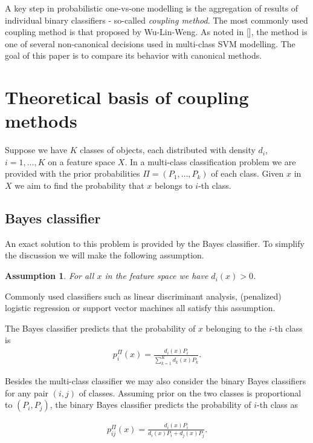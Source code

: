 \documentclass[twoside,11pt]{article}
\newtheorem{assumption}{Assumption}
\begin{document}
A key step in probabilistic one-vs-one modelling is the aggregation of results of individual binary classifiers - so-called \emph{coupling method}. The most commonly used coupling method is that proposed by Wu-Lin-Weng. As noted in [\cite{dohau}], the method is one of several non-canonical decisions used in multi-class SVM modelling. The goal of this paper is to compare its behavior with canonical methods. 


\section{Theoretical basis of coupling methods}

Suppose we have $K$ classes of objects, each distributed with density $d_i$, $i=1,\ldots, K$ on a feature space $X$. In a multi-class classification problem we are provided with the prior probabilities $\Pi = (P_1, \ldots, P_k)$ of each class. Given $x$ in $X$ we aim to find the probability that $x$ belongs to $i$-th class. 


\subsection{Bayes classifier}

An exact solution to this problem is provided by the Bayes classifier. To simplify the discussion we will make the following assumption.


\begin{assumption} \label{ass:1}
 For all $x$ in the feature space we have $d_i(x) > 0$.
\end{assumption}
Commonly used classifiers such as linear discriminant analysis, (penalized) logistic regression or support vector machines all satisfy this assumption.

The Bayes classifier predicts that the probability of $x$ belonging to the $i$-th class is
\begin{align}
 p^\Pi_i(x) = \frac{d_i(x) P_i}{\sum_{k=1}^K d_k(x)P_k}.
\end{align}

Besides the multi-class classifier we may also consider the binary Bayes classifiers for any pair $(i,j)$ of classes. Assuming prior on the two classes is proportional to $(P_i, P_j)$, the binary Bayes classifier predicts the probability of $i$-th class as 

\begin{align}
	p_{ij}^\Pi(x) = \frac{d_i(x) P_i}{d_i(x)P_i + d_j(x)P_j}.
\end{align}
\end{document}
